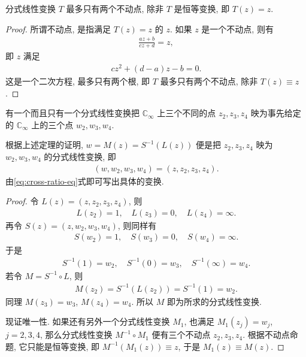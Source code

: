 \documentclass[../../main.tex]{subfiles}%
\begin{document}
\begin{proposition}
分式线性变换 $T$ 最多只有两个不动点, 除非 $T$ 是恒等变换, 即 $T(z) = z$.
\end{proposition}

\begin{proof}
所谓不动点, 是指满足 $T(z) = z$ 的 $z$. 如果 $z$ 是一个不动点, 则有
\begin{align*}
\frac{az+b}{cz+d} = z,
\end{align*}
即 $z$ 满足
\begin{align*}
cz^2 + (d-a)z - b = 0.
\end{align*}
这是一个二次方程, 最多只有两个根, 即 $T$ 最多只有两个不动点, 除非 $T(z) \equiv z$.
\end{proof}

\begin{theorem}
有一个而且只有一个分式线性变换把 $\mathbb{C}_\infty$ 上三个不同的点 $z_2,z_3,z_4$ 映为事先给定的 $\mathbb{C}_\infty$ 上的三个点 $w_2,w_3,w_4$.
\end{theorem}
\begin{remark}
根据上述定理的证明, $w = M(z) = S^{-1}(L(z))$ 便是把 $z_2,z_3,z_4$ 映为 $w_2,w_3,w_4$ 的分式线性变换, 即
\begin{align}
(w,w_2,w_3,w_4) = (z,z_2,z_3,z_4). \label{eq:cross-ratio-eq}
\end{align}
由\eqref{eq:cross-ratio-eq}式即可写出具体的变换.
\end{remark}
\begin{proof}
令 $L(z) = (z,z_2,z_3,z_4)$, 则
\begin{align*}
L(z_2) = 1, \quad L(z_3) = 0, \quad L(z_4) = \infty.
\end{align*}
再令 $S(z) = (z,w_2,w_3,w_4)$, 则同样有
\begin{align*}
S(w_2) = 1, \quad S(w_3) = 0, \quad S(w_4) = \infty.
\end{align*}
于是
\begin{align*}
S^{-1}(1) = w_2, \quad S^{-1}(0) = w_3, \quad S^{-1}(\infty) = w_4.
\end{align*}
若令 $M = S^{-1} \circ L$, 则
\begin{align*}
M(z_2) = S^{-1}(L(z_2)) = S^{-1}(1) = w_2.
\end{align*}
同理 $M(z_3) = w_3$, $M(z_4) = w_4$. 所以 $M$ 即为所求的分式线性变换.

现证唯一性. 如果还有另外一个分式线性变换 $M_1$, 也满足 $M_1(z_j) = w_j$, $j=2,3,4$, 那么分式线性变换 $M^{-1} \circ M_1$ 便有三个不动点 $z_2,z_3,z_4$. 根据不动点命题, 它只能是恒等变换, 即 $M^{-1}(M_1(z)) \equiv z$, 于是 $M_1(z) \equiv M(z)$.
\end{proof}
\end{document}
